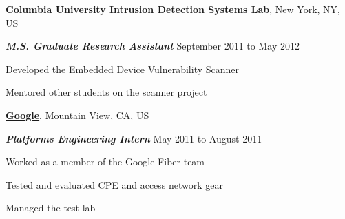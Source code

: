 \documentclass[10pt]{article}
\newenvironment{outerlist}[1][\enskip\textbullet]%
        {\begin{itemize}[#1]}{\end{itemize}%
         \vspace{-.6\baselineskip}}
\newenvironment{innerlist}[1][\enskip\textbullet]%
        {\begin{compactitem}[#1]}{\end{compactitem}}
\newcommand{\blankline}{\quad\pagebreak[2]}
\begin{document}
\blankline

\href{http://www.hacktory.cs.columbia.edu/}{\textbf{Columbia University Intrusion Detection Systems Lab}},
New York, NY, US
\begin{outerlist}
\item[] \textit{\textbf{M.S. Graduate Research Assistant}}
  \hfill September 2011 to May 2012
  \begin{innerlist}
  \item Developed the \href{http://www.hacktory.cs.columbia.edu/content/vulnerable-embedded-device-scan.html}{Embedded Device Vulnerability Scanner}
  \item Mentored other students on the scanner project
  \end{innerlist}
\end{outerlist}

\blankline

\href{https://www.google.com/}{\textbf{Google}},
Mountain View, CA, US
\begin{outerlist}
\item[] \textit{\textbf{Platforms Engineering Intern}}
  \hfill May 2011 to August 2011
  \begin{innerlist}
  \item Worked as a member of the Google Fiber team
  \item Tested and evaluated CPE and access network gear
  \item Managed the test lab
  \end{innerlist}
\end{outerlist}

\blankline
\end{document}
